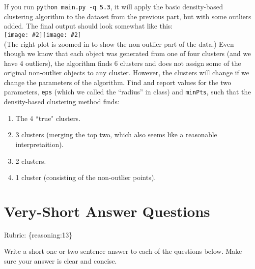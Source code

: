 \documentclass{article}
\def\rubric#1{\gre{Rubric: \{#1\}}}{}
\def\blu#1{{\color{blu}#1}}
\def\gre#1{{\color{gre}#1}}
\newcommand{\fig}[2]{\texttt{[image: \#2]}}
\def\enum#1{\begin{enumerate}#1\end{enumerate}}
\begin{document}
If you run \texttt{python main.py -q 5.3},
it will apply the basic density-based clustering algorithm to the dataset from the previous part, but with some outliers added.
The final output should look somewhat like this:\\
\fig{.49}{../figs/density}\fig{.49}{../figs/density2}\\
(The right plot is zoomed in to show the non-outlier part of the data.)
Even though we know that each object was generated from one of four clusters (and we have 4 outliers),
 the algorithm finds 6 clusters and does not assign some of the original non-outlier
  objects to any cluster. However, the clusters will change if we change the parameters
  of the algorithm. Find and report values for the two
  parameters, \texttt{eps} (which we called the ``radius'' in class) and \texttt{minPts},
   such that the density-based clustering method finds:
\blu{\enum{
\item The 4 ``true" clusters.
\item 3 clusters (merging the top two, which also seems like a reasonable interpretaition).
\item 2 clusters.
\item 1 cluster (consisting of the non-outlier points).
}
}



\section{Very-Short Answer Questions}
\rubric{reasoning:13}

\blu{Write a short one or two sentence answer to each of the questions below}. Make sure your answer is clear and concise.
\end{document}
